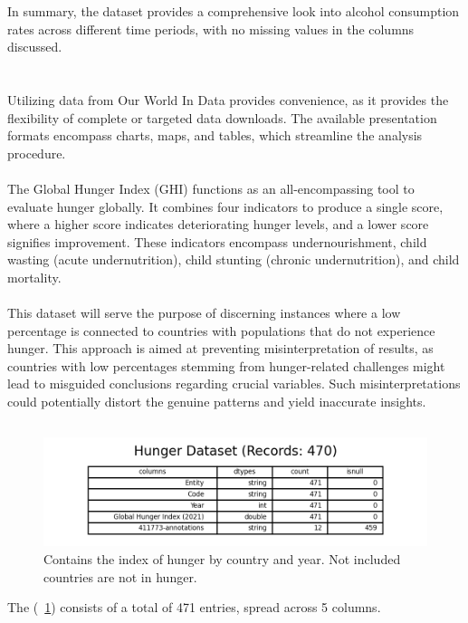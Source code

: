                In summary, the dataset provides a comprehensive look into alcohol consumption rates across different time periods, with no missing values in the columns discussed.


    \section{\dsHunger}

        \subsection{\duCollectInitialData}

            Utilizing data from Our World In Data provides convenience, as it provides the flexibility of complete or targeted data downloads. The available presentation formats encompass charts, maps, and tables, which streamline the analysis procedure.
            \\
            \\
            The Global Hunger Index (GHI) functions as an all-encompassing tool to evaluate hunger globally. It combines four indicators to produce a single score, where a higher score indicates deteriorating hunger levels, and a lower score signifies improvement. These indicators encompass undernourishment, child wasting (acute undernutrition), child stunting (chronic undernutrition), and child mortality.
            \\
            \\
            This dataset will serve the purpose of discerning instances where a low percentage is connected to countries with populations that do not experience hunger. This approach is aimed at preventing misinterpretation of results, as countries with low percentages stemming from hunger-related challenges might lead to misguided conclusions regarding crucial variables. Such misinterpretations could potentially distort the genuine patterns and yield inaccurate insights.

        \subsection{\duDescribeTheData}
            \begin{figure}[H]
                \centering
                \includegraphics[scale=1.3]{images/du_hunger_dataset}
                \caption{Contains the index of hunger by country and year. Not included countries are not in hunger.}
                \label{fig:du-hunger-datasets}
            \end{figure}
            The \textit{\dsHunger} (\figurename~\ref{fig:du-hunger-datasets}) consists of a total of 471 entries, spread across 5 columns.

